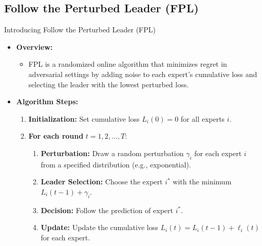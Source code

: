\documentclass{beamer}
\begin{document}
\subsection{Follow the Perturbed Leader (FPL)}
\begin{frame}{Introducing Follow the Perturbed Leader (FPL)}
    \begin{itemize}
        \item \textbf{Overview:}
        \begin{itemize}
            \item FPL is a randomized online algorithm that minimizes regret in adversarial settings by adding noise to each expert's cumulative loss and selecting the leader with the lowest perturbed loss.
        \end{itemize}
        \item \textbf{Algorithm Steps:}
            \begin{enumerate}
                \item \textbf{Initialization:} Set cumulative loss \( L_i(0) = 0 \) for all experts \( i \).
                \item \textbf{For each round } \( t = 1, 2, \ldots, T \):
                    \begin{enumerate}
                        \item \textbf{Perturbation:} Draw a random perturbation \( \gamma_i \) for each expert \( i \) from a specified distribution (e.g., exponential).
                        \item \textbf{Leader Selection:} Choose the expert \( i^* \) with the minimum \( L_i(t-1) + \gamma_i \).
                        \item \textbf{Decision:} Follow the prediction of expert \( i^* \).
                        \item \textbf{Update:} Update the cumulative loss \( L_i(t) = L_i(t-1) + \ell_i(t) \) for each expert.
                    \end{enumerate}
            \end{enumerate}
    \end{itemize}
\end{frame}
\end{document}
